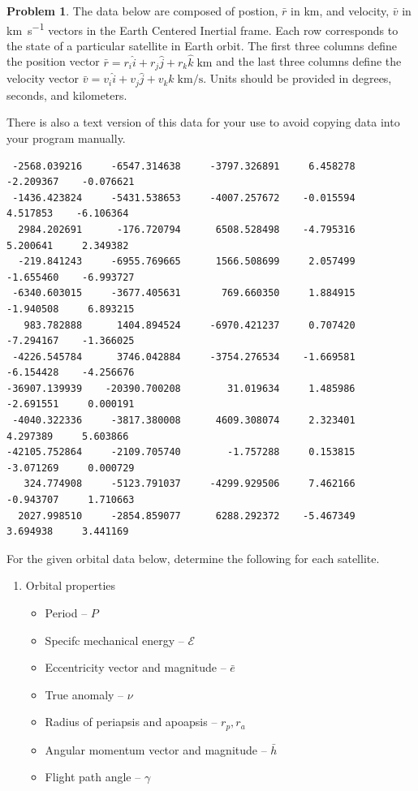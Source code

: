 \documentclass[10pt]{article}
\theoremstyle{definition}
\newtheorem{prob}{Problem}[section]
\newenvironment{subprob}%
{\renewcommand{\theenumi}{\alph{enumi}}\renewcommand{\labelenumi}{(\theenumi)}\begin{enumerate}}%
{\end{enumerate}}%
\begin{document}
\begin{prob}
    The data below are composed of postion, \( \bar r \) in \si{\kilo\meter}, and velocity, \( \bar v \) in \si{\kilo\meter\per\second} vectors in the Earth Centered Inertial frame. 
    Each row corresponds to the state of a particular satellite in Earth orbit. 
    The first three columns define the position vector \( \bar r = r_i \hat i + r_j \hat j + r_k \hat k \; \si{\kilo\meter} \) and the last three columns define the velocity vector \( \bar v = v_i \hat i + v_j \hat j + v_k \hat k \; \si{\kilo\meter\per\second} \).
Units should be provided in degrees, seconds, and kilometers.

There is also a text version of this data for your use to avoid copying data into your program manually. 
    \begin{verbatim}
 -2568.039216     -6547.314638     -3797.326891     6.458278    -2.209367    -0.076621
 -1436.423824     -5431.538653     -4007.257672    -0.015594     4.517853    -6.106364
  2984.202691      -176.720794      6508.528498    -4.795316     5.200641     2.349382
  -219.841243     -6955.769665      1566.508699     2.057499    -1.655460    -6.993727
 -6340.603015     -3677.405631       769.660350     1.884915    -1.940508     6.893215
   983.782888      1404.894524     -6970.421237     0.707420    -7.294167    -1.366025
 -4226.545784      3746.042884     -3754.276534    -1.669581    -6.154428    -4.256676
-36907.139939    -20390.700208        31.019634     1.485986    -2.691551     0.000191
 -4040.322336     -3817.380008      4609.308074     2.323401     4.297389     5.603866
-42105.752864     -2109.705740        -1.757288     0.153815    -3.071269     0.000729
   324.774908     -5123.791037     -4299.929506     7.462166    -0.943707     1.710663
  2027.998510     -2854.859077      6288.292372    -5.467349     3.694938     3.441169
    \end{verbatim}
    For the given orbital data below, determine the following for each satellite.

    \begin{subprob}
    \item Orbital properties
    \begin{itemize}
        \item Period -- \( P \) 
        \item Specifc mechanical energy -- \( \mathcal{E} \) 
        \item Eccentricity vector and magnitude -- \( \bar e\)
        \item True anomaly -- \( \nu \)
        \item Radius of periapsis and apoapsis -- \( r_p, r_a \)
        \item Angular momentum vector and magnitude -- \( \bar h \)
        \item Flight path angle -- \( \gamma \)
    \end{itemize}


\end{subprob}
\end{prob}
\end{document}
